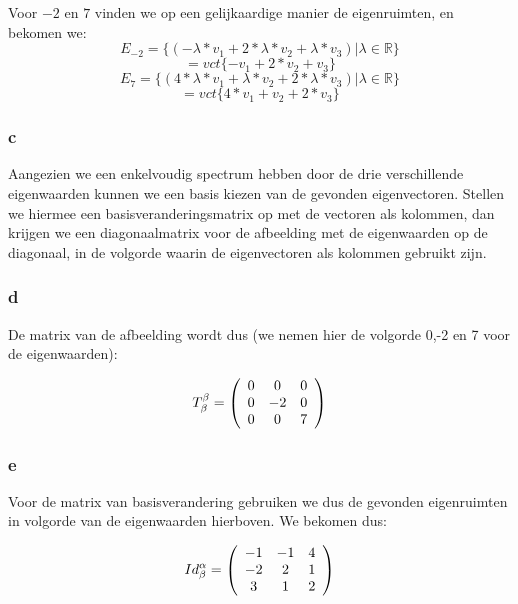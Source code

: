 \documentclass[lineaire_algebra_oplossingen.tex]{subfiles}
\begin{document}
Voor $-2$ en $7$ vinden we op een gelijkaardige manier de eigenruimten, en bekomen we:
\[E_{-2} = \{(-\lambda*v_1+2*\lambda*v_2+\lambda*v_3)|\lambda\in\mathbb{R}\}\]
\[=vct\{-v_1+2*v_2+v_3\}\]
\[E_{7} = \{(4*\lambda*v_1+\lambda*v_2+2*\lambda*v_3)|\lambda\in\mathbb{R}\}\]
\[=vct\{4*v_1+v_2+2*v_3\}\]

\subsubsection*{c}

Aangezien we een enkelvoudig spectrum hebben door de drie verschillende eigenwaarden kunnen we een basis kiezen van de gevonden eigenvectoren. Stellen we hiermee een basisveranderingsmatrix op met de vectoren als kolommen, dan krijgen we een diagonaalmatrix voor de afbeelding met de eigenwaarden op de diagonaal, in de volgorde waarin de eigenvectoren als kolommen gebruikt zijn.

\subsubsection*{d}

De matrix van de afbeelding wordt dus (we nemen hier de volgorde 0,-2 en 7 voor de eigenwaarden):

\[
T^\beta_\beta = \left(
\begin{array}{c c c}
0 & 0 & 0 \\
0 & -2 & 0 \\
0 & 0 & 7 \\
\end{array}
\right)
\]

\subsubsection*{e}

Voor de matrix van basisverandering gebruiken we dus de gevonden eigenruimten in volgorde van de eigenwaarden hierboven. We bekomen dus:

\[
Id^\alpha_\beta = \left(
\begin{array}{c c c}
-1 & -1 & 4 \\
-2 & 2 & 1 \\
3 & 1 & 2 \\
\end{array}
\right)
\]
\end{document}
